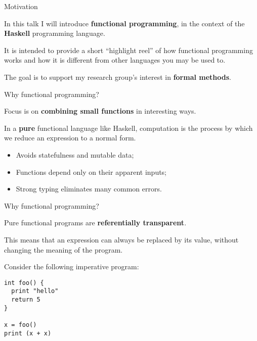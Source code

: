 
%
\begin{frame}{Motivation}

In this talk I will introduce \textbf{functional programming}, in the context of
the \textbf{Haskell} programming language.

It is intended to provide a short ``highlight reel'' of how functional
programming works and how it is different from other languages you may be used
to.

The goal is to support my research group's interest in \textbf{formal methods}.

\end{frame}

%
\begin{frame}{Why functional programming?}

Focus is on \textbf{combining small functions} in interesting ways.

In a \textbf{pure} functional language like Haskell, computation is the process
by which we reduce an expression to a normal form.

\begin{itemize}
  \item Avoids statefulness and mutable data;
  \item Functions depend only on their apparent inputs;
  \item Strong typing eliminates many common errors.
\end{itemize}

\end{frame}

%
\begin{frame}[fragile]{Why functional programming?}

Pure functional programs are \textbf{referentially transparent}.

This means that an expression can always be replaced by its value, without
changing the meaning of the program.

Consider the following imperative program:

\begin{block}{}
\begin{verbatim}
int foo() {
  print "hello"
  return 5
}

x = foo()
print (x + x)
\end{verbatim}
\end{block}

\end{frame}

